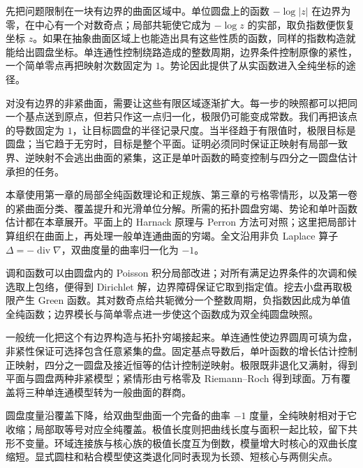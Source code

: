 \ProseParagraphBreak

先把问题限制在一块有边界的曲面区域中。单位圆盘上的函数 \(-\log|z|\) 在边界为零，在中心有一个对数奇点；局部共轭使它成为 \(-\log z\) 的实部，取负指数便恢复坐标 \(z\)。如果在抽象曲面区域上也能造出具有这些性质的函数，同样的指数构造就能给出圆盘坐标。单连通性控制绕路造成的整数周期，边界条件控制原像的紧性，一个简单零点再把映射次数固定为 \(1\)。势论因此提供了从实函数进入全纯坐标的途径。

\ProseParagraphBreak

对没有边界的非紧曲面，需要让这些有限区域逐渐扩大。每一步的映照都可以把同一个基点送到原点，但若只作这一点归一化，极限仍可能变成常数。我们再把该点的导数固定为 \(1\)，让目标圆盘的半径记录尺度。当半径趋于有限值时，极限目标是圆盘；当它趋于无穷时，目标是整个平面。证明必须同时保证正映射有局部一致界、逆映射不会逃出曲面的紧集，这正是单叶函数的畸变控制与四分之一圆盘估计承担的任务。

\ProseParagraphBreak

本章使用第一章的局部全纯函数理论和正规族、第三章的亏格零情形，以及第一卷的紧曲面分类、覆盖提升和光滑单位分解。所需的拓扑圆盘穷竭、势论和单叶函数估计都在本章展开。平面上的 Harnack 原理与 Perron 方法可对照\parencite[第6章第3.2节、第4.2节]{Ahlfors1979Complex}；这里把局部计算组织在曲面上，再处理一般单连通曲面的穷竭。全文沿用非负 Laplace 算子 \(\Delta=-\operatorname{div}\nabla\)，双曲度量的曲率归一化为 \(-1\)。







\begin{chaptersummary}
	调和函数可以由圆盘内的 Poisson 积分局部改进；对所有满足边界条件的次调和候选取上包络，便得到 Dirichlet 解，边界障碍保证它取到指定值。挖去小盘再取极限产生 Green 函数。其对数奇点给共轭微分一个整数周期，负指数因此成为单值全纯函数；边界模长与简单零点进一步使这个函数成为双全纯圆盘映照。

	\ProseParagraphBreak

	一般统一化把这个有边界构造与拓扑穷竭接起来。单连通性使边界圆周可填为盘，非紧性保证可选择包含任意紧集的盘。固定基点导数后，单叶函数的增长估计控制正映射，四分之一圆盘及接近恒等的估计控制逆映射。极限既非退化又满射，得到平面与圆盘两种非紧模型；紧情形由亏格零及 Riemann--Roch 得到球面。万有覆盖将三种单连通模型转为一般曲面的群商。

	\ProseParagraphBreak

	圆盘度量沿覆盖下降，给双曲型曲面一个完备的曲率 \(-1\) 度量，全纯映射相对于它收缩；局部取等号对应全纯覆盖。极值长度则把曲线长度与面积一起比较，留下共形不变量。环域连接族与核心族的极值长度互为倒数，模量增大时核心的双曲长度缩短。显式圆柱和粘合模型使这类退化同时表现为长颈、短核心与两侧尖点。
\end{chaptersummary}

